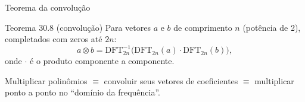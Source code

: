 \documentclass[aspectratio=169,10pt]{beamer}
\newcommand{\DFT}{\mathrm{DFT}}
\begin{document}
\begin{frame}{Teorema da convolução}
  \begin{block}{Teorema 30.8 (convolução)}
    Para vetores $a$ e $b$ de comprimento $n$ (potência de 2), completados com zeros até $2n$:
    \[
      a \otimes b = \DFT_{2n}^{-1}\big(\DFT_{2n}(a) \cdot \DFT_{2n}(b)\big),
    \]
    onde $\cdot$ é o produto componente a componente.
  \end{block}
  \vspace{4pt}
  \centering

  \vspace{8pt}
  \raggedright
  {\small Multiplicar polinômios $\equiv$ convoluir seus vetores de coeficientes
  $\equiv$ multiplicar ponto a ponto no ``domínio da frequência''.}
\end{frame}
\end{document}
